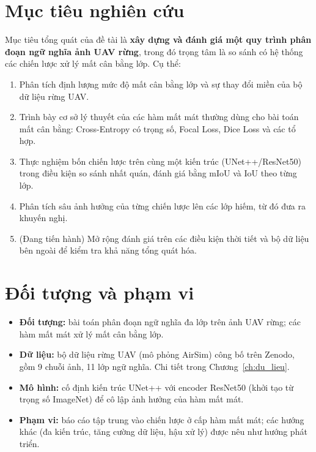 \section{Mục tiêu nghiên cứu}

Mục tiêu tổng quát của đề tài là \textbf{xây dựng và đánh giá một quy trình phân
đoạn ngữ nghĩa ảnh UAV rừng}, trong đó trọng tâm là so sánh có hệ thống các chiến
lược xử lý mất cân bằng lớp. Cụ thể:

\begin{enumerate}[leftmargin=1.4cm]
  \item Phân tích định lượng mức độ mất cân bằng lớp và sự thay đổi miền của bộ dữ
  liệu rừng UAV.
  \item Trình bày cơ sở lý thuyết của các hàm mất mát thường dùng cho bài toán mất
  cân bằng: Cross-Entropy có trọng số, Focal Loss, Dice Loss và các tổ hợp.
  \item Thực nghiệm bốn chiến lược trên cùng một kiến trúc (UNet++/ResNet50) trong
  điều kiện so sánh nhất quán, đánh giá bằng mIoU và IoU theo từng lớp.
  \item Phân tích sâu ảnh hưởng của từng chiến lược lên các lớp hiếm, từ đó đưa ra
  khuyến nghị.
  \item (Đang tiến hành) Mở rộng đánh giá trên các điều kiện thời tiết và bộ dữ liệu
  bên ngoài để kiểm tra khả năng tổng quát hóa.
\end{enumerate}

\section{Đối tượng và phạm vi}

\begin{itemize}[leftmargin=1.4cm]
  \item \textbf{Đối tượng:} bài toán phân đoạn ngữ nghĩa đa lớp trên ảnh UAV rừng;
  các hàm mất mát xử lý mất cân bằng lớp.
  \item \textbf{Dữ liệu:} bộ dữ liệu rừng UAV (mô phỏng AirSim) công bố trên Zenodo,
  gồm 9 chuỗi ảnh, 11 lớp ngữ nghĩa. Chi tiết trong Chương~\ref{ch:du_lieu}.
  \item \textbf{Mô hình:} cố định kiến trúc UNet++ với encoder ResNet50 (khởi tạo từ
  trọng số ImageNet) để cô lập ảnh hưởng của hàm mất mát.
  \item \textbf{Phạm vi:} báo cáo tập trung vào chiến lược ở cấp hàm mất mát; các
  hướng khác (đa kiến trúc, tăng cường dữ liệu, hậu xử lý) được nêu như hướng phát
  triển.
\end{itemize}

